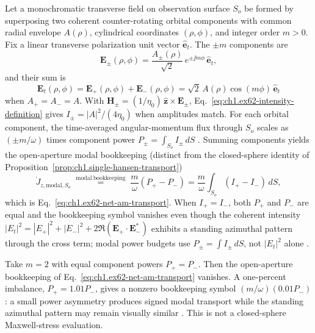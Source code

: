 Let a monochromatic transverse field on observation surface \(S_o\) be formed by
superposing two coherent counter-rotating orbital components with common radial
envelope \(A(\rho)\), cylindrical coordinates \((\rho,\phi)\), and integer order
\(m>0\). Fix a linear transverse polarization unit vector \(\hat{\mathbf{e}}_t\). The
\(\pm m\) components are
\begin{equation}
\label{eq:ch1.ex62-counter-rotating-components}
\mathbf{E}_\pm(\rho,\phi)=\frac{A_\pm(\rho)}{\sqrt{2}}\,e^{\pm\jj m\phi}\,\hat{\mathbf{e}}_t,
\end{equation}
and their sum is
\begin{equation}
\label{eq:ch1.ex62-counter-rotating-superposition}
\mathbf{E}_t(\rho,\phi)
=
\mathbf{E}_+(\rho,\phi)+\mathbf{E}_-(\rho,\phi)
=
\sqrt{2}\,A(\rho)\cos(m\phi)\,\hat{\mathbf{e}}_t
\end{equation}
when \(A_+=A_-=A\). With \(\mathbf{H}_\pm=(1/\eta_0)\,\hat{\mathbf{z}}\times\mathbf{E}_\pm\), Eq.~\eqref{eq:ch1.ex62-intensity-definition} gives \(I_\pm=|A|^2/(4\eta_0)\) when amplitudes match. For each orbital component, the time-averaged angular-momentum flux through \(S_o\)
scales as \((\pm m/\omega)\) times component power
\(P_\pm = \int_{S_o} I_\pm\,dS\) \cite{stratton1941}. Summing components yields the open-aperture modal bookkeeping (distinct from the closed-sphere identity of Proposition~\ref{prop:ch1.single-hansen-transport})
\begin{equation}
\label{eq:ch1.ex62-channel-sum}
\dot J_{z,\mathrm{modal},S_o}
\;\stackrel{\mathrm{modal\ bookkeeping}}{=}\;
\frac{m}{\omega}(P_+ - P_-)
=
\frac{m}{\omega}\int_{S_o}(I_+-I_-)\,dS,
\end{equation}
which is Eq.~\eqref{eq:ch1.ex62-net-am-transport}. When \(I_+=I_-\), both \(P_+\) and
\(P_-\) are equal and the bookkeeping symbol vanishes even though the coherent intensity
\(|E_t|^2=|E_+|^2+|E_-|^2+2\Re(\mathbf{E}_+\cdot\mathbf{E}_-^*)\) exhibits a standing azimuthal pattern through the cross term; modal power budgets use \(P_\pm=\int I_\pm\,dS\), not \(|E_t|^2\) alone \cite{stratton1941,allen1992}.

\begin{example}
\label{ex:ch1.counter-rotating-numeric}
Take $m=2$ with equal component powers $P_+=P_-$. Then the open-aperture bookkeeping of Eq.~\eqref{eq:ch1.ex62-net-am-transport} vanishes. A one-percent imbalance, $P_+=1.01P_-$, gives a nonzero bookkeeping symbol $(m/\omega)(0.01P_-)$: a small power asymmetry produces signed modal transport while the standing azimuthal pattern may remain visually similar \cite{allen1992}. This is not a closed-sphere Maxwell-stress evaluation.
\end{example}

